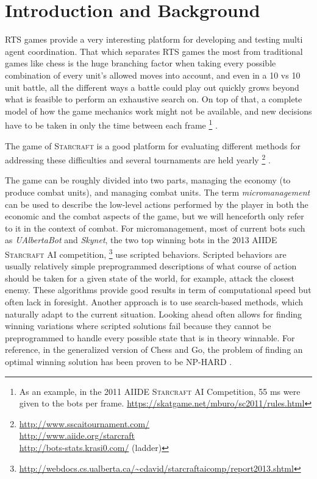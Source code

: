 \section{Introduction and Background}
RTS games provide a very interesting platform for developing and testing multi agent coordination.
That which separates RTS games the most from traditional games like chess is the huge branching factor when taking every possible combination of every unit's allowed moves into account, and even in a 10 vs 10 unit battle, all the different ways a battle could play out quickly grows beyond what is feasible to perform an exhaustive search on.
On top of that, a complete model of how the game mechanics work might not be available, and new decisions have to be taken in only the time between each frame
\footnote{
As an example, in the 2011 AIIDE \textsc{Starcraft} AI Competition, 55 ms were given to the bots per frame.
\url{https://skatgame.net/mburo/sc2011/rules.html}
}
.

The game of \textsc{Starcraft} is a good platform for evaluating different methods for addressing these difficulties and several tournaments are held yearly
\footnote{
\url{http://www.sscaitournament.com/}\\ 
\url{http://www.aiide.org/starcraft} \\
\url{http://bots-stats.krasi0.com/} (ladder)
}
.

The game can be roughly divided into two parts, managing the economy (to produce combat units), and managing combat units.
The term \emph{micromanagement} can be used to describe the low-level actions performed by the player in both the economic and the combat aspects of the game, but we will henceforth only refer to it in the context of combat.
For micromanagement, most of current bots such as \emph{UAlbertaBot} and \emph{Skynet}, the two top winning bots in the 2013 AIIDE \textsc{Starcraft} AI competition,
\footnote{\url{http://webdocs.cs.ualberta.ca/~cdavid/starcraftaicomp/report2013.shtml}
}
use scripted behaviors.
Scripted behaviors are usually relatively simple preprogrammed descriptions of what course of action should be taken for a given state of the world, for example, attack the closest enemy.
These algorithms provide good results in term of computational speed but often lack in foresight.
Another approach is to use search-based methods, which naturally adapt to the current situation.
Looking ahead often allows for finding winning variations where scripted solutions fail because they cannot be preprogrammed to handle every possible state that is in theory winnable.
For reference, in the generalized version of Chess and Go, the problem of finding an optimal winning solution has been proven to be NP-HARD \cite{nphard}.

